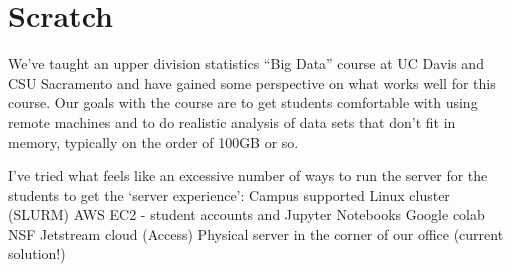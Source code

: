 \documentclass[12pt]{article}
\begin{document}
\section{Scratch}

We've taught an upper division statistics ``Big Data'' course at UC Davis and CSU Sacramento and have gained some perspective on what works well for this course.
Our goals with the course are to get students comfortable with using remote machines and to do realistic analysis of data sets that don’t fit in memory, typically on the order of 100GB or so.
 
I’ve tried what feels like an excessive number of ways to run the server for the students to get the `server experience':
Campus supported Linux cluster (SLURM)
AWS EC2 - student accounts and Jupyter Notebooks
Google colab
NSF Jetstream cloud (Access)
Physical server in the corner of our office (current solution!)
\end{document}
